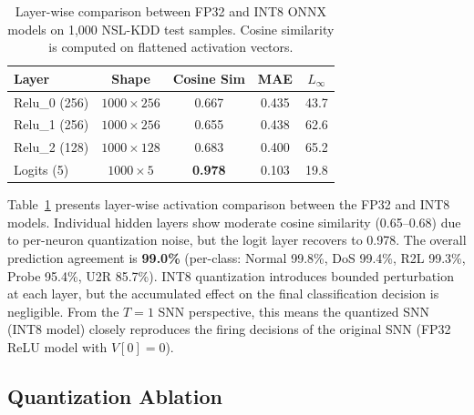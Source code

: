 \documentclass[10pt,twocolumn]{article}
\begin{document}
\begin{table}[t]
\centering
\caption{Layer-wise comparison between FP32 and INT8 ONNX models
on 1,000 NSL-KDD test samples. Cosine similarity is computed on
flattened activation vectors.}
\label{tab:layerwise}
\small
\begin{tabular}{@{}lcccc@{}}
\toprule
\textbf{Layer} & \textbf{Shape} & \textbf{Cosine Sim} & \textbf{MAE} & \textbf{$L_\infty$} \\
\midrule
Relu\_0 (256) & $1000{\times}256$ & 0.667 & 0.435 & 43.7 \\
Relu\_1 (256) & $1000{\times}256$ & 0.655 & 0.438 & 62.6 \\
Relu\_2 (128) & $1000{\times}128$ & 0.683 & 0.400 & 65.2 \\
Logits (5)    & $1000{\times}5$   & \textbf{0.978} & 0.103 & 19.8 \\
\bottomrule
\end{tabular}
\end{table}

Table~\ref{tab:layerwise} presents layer-wise activation comparison
between the FP32 and INT8 models.
Individual hidden layers show moderate cosine similarity (0.65--0.68)
due to per-neuron quantization noise, but the logit layer recovers to
0.978.
The overall prediction agreement is \textbf{99.0\%}
(per-class: Normal 99.8\%, DoS 99.4\%, R2L 99.3\%, Probe 95.4\%,
U2R 85.7\%).
INT8 quantization introduces bounded perturbation
at each layer, but the accumulated effect on the final classification decision
is negligible.
From the $T{=}1$ SNN perspective, this means the quantized SNN
(INT8 model) closely reproduces the firing decisions of the original SNN
(FP32 ReLU model with $V[0]{=}0$).

\subsection{Quantization Ablation}
\label{sec:quant_ablation}
\end{document}
